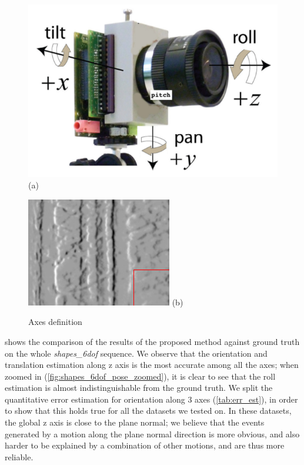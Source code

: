\begin{figure}
  \begin{minipage}[t]{0.48\textwidth}
    \centering \includegraphics[width = \textwidth]{images/axes.png}
    (a)
  \end{minipage}
  \hfill
  \begin{minipage}[t]{0.48\textwidth}
    \centering \includegraphics[width =
    \textwidth]{images/slider_groundtruth.png} (b)
  \end{minipage}
  \hfill
  \caption{Axes definition}
  \label{fig:axes}
\end{figure}
 shows the comparison of the results of the
proposed method against ground truth on the whole
\textit{shapes\_6dof} sequence. We observe that the orientation and
translation estimation along z axis is the most accurate among all the
axes; when zoomed in (\cref{fig:shapes_6dof_pose_zoomed}), it is clear
to see that the roll estimation is almost indistinguishable from the
ground truth. We split the quantitative error estimation for
orientation along 3 axes (\cref{tab:err_est}), in order to show that
this holds true for all the datasets we tested on. In these datasets,
the global z axis is close to the plane normal; we believe that the
events generated by a motion along the plane normal direction is more
obvious, and also harder to be explained by a combination of other
motions, and are thus more reliable.

